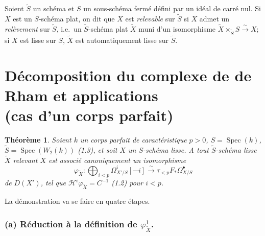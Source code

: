 \documentclass[12pt,a4paper]{article}
\theoremstyle{plain}
\newtheorem{theorem}{Th\'eor\`eme}[section]
\theoremstyle{definition}
\theoremstyle{remark}
\DeclareMathOperator{\Spec}{Spec}
\begin{document}
Soient $\tilde{S}$ un sch\'ema et $S$ un sous-sch\'ema ferm\'e d\'efini par un id\'eal de carr\'e nul.
Si $X$ est un $S$-sch\'ema plat, on dit que $X$ est \emph{relevable} sur $\tilde{S}$ si $X$ admet un \emph{rel\`evement}
sur $\tilde{S}$, i.e.~un $\tilde{S}$-sch\'ema plat $\tilde{X}$ muni d'un isomorphisme $\tilde{X} \times_{\tilde{S}} S \xrightarrow{\sim} X$; si $X$ est lisse sur
$S$, $\tilde{X}$ est automatiquement lisse sur $\tilde{S}$.


\section{D\'ecomposition du complexe de de Rham et applications\\(cas d'un corps parfait)}

\begin{theorem}\label{thm:2.1}
Soient $k$ un corps parfait de caract\'eristique $p>0$, $S = \Spec(k)$,
$\tilde{S} = \Spec(W_2(k))$ \textup{(1.3)}, et soit $X$ un $S$-sch\'ema lisse. A tout $\tilde{S}$-sch\'ema lisse $\tilde{X}$ relevant $X$
est associ\'e canoniquement un isomorphisme
\[
\varphi_{\tilde{X}}: \bigoplus_{i < p} \Omega^i_{X'/S}[-i] \xrightarrow{\sim} \tau_{<p} F_* \Omega^{\bullet}_{X/S}
\]
de $D(X')$, tel que $\mathscr{H}^i \varphi_{\tilde{X}} = C^{-1}$ \textup{(1.2)} pour $i < p$.
\end{theorem}

La d\'emonstration va se faire en quatre \'etapes.

\subsubsection*{(a) R\'eduction \`a la d\'efinition de $\varphi^1_{\tilde{X}}$.}
\end{document}
